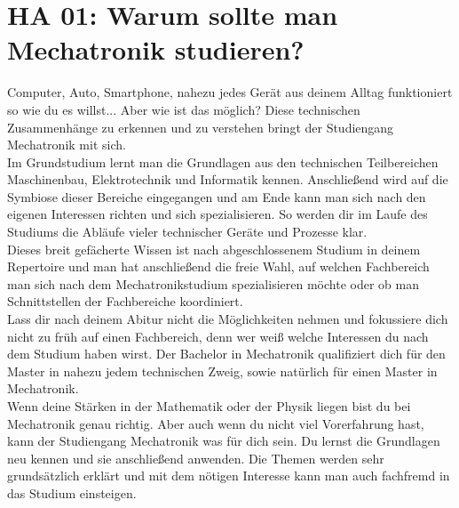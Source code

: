 \section{HA 01: Warum sollte man Mechatronik studieren?}
  Computer, Auto, Smartphone, nahezu jedes Gerät aus deinem Alltag funktioniert so wie du es willst... Aber wie ist das möglich? Diese technischen Zusammenhänge zu erkennen und zu verstehen bringt der Studiengang Mechatronik mit sich.\\
  Im Grundstudium lernt man die Grundlagen aus den technischen Teilbereichen Maschinenbau, Elektrotechnik und Informatik kennen. Anschließend wird auf die Symbiose dieser Bereiche eingegangen und am Ende kann man sich nach den eigenen Interessen richten und sich spezialisieren. So werden dir im Laufe des Studiums die Abläufe vieler technischer Geräte und Prozesse klar.\\
  Dieses breit gefächerte Wissen ist nach abgeschlossenem Studium in deinem Repertoire und man hat anschließend die freie Wahl, auf welchen Fachbereich man sich nach dem Mechatronikstudium spezialisieren möchte oder ob man Schnittstellen der Fachbereiche koordiniert.\\
  Lass dir nach deinem Abitur nicht die Möglichkeiten nehmen und fokussiere   dich nicht zu früh auf einen Fachbereich, denn wer weiß welche Interessen du nach dem Studium haben wirst. Der Bachelor in Mechatronik qualifiziert dich für den Master in nahezu jedem technischen Zweig, sowie natürlich für einen Master in Mechatronik.\\
  Wenn deine Stärken in der Mathematik oder der Physik liegen bist du bei Mechatronik genau richtig. Aber auch wenn du nicht viel Vorerfahrung hast, kann der Studiengang Mechatronik was für dich sein. Du lernst die Grundlagen neu kennen und sie anschließend anwenden. Die Themen werden sehr grundsätzlich erklärt und mit dem nötigen Interesse kann man auch fachfremd in das Studium einsteigen.
